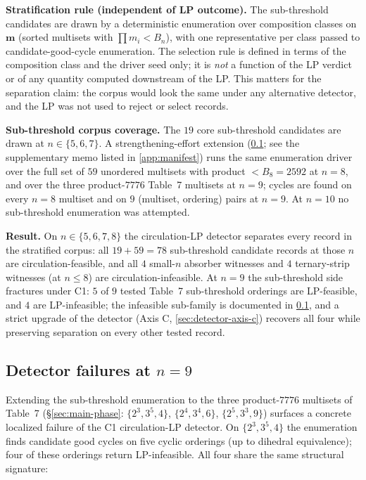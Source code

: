 \documentclass[11pt,a4paper]{article}
\theoremstyle{plain}
\theoremstyle{definition}
\newcommand{\Bn}{B_n}
\begin{document}
\textbf{Stratification rule (independent of LP outcome).} The
sub-threshold candidates are drawn by a deterministic enumeration
over composition classes on $\mathbf{m}$ (sorted multisets with
$\prod m_i < \Bn$), with one representative per class passed to
candidate-good-cycle enumeration.  The selection rule is defined in
terms of the composition class and the driver seed only; it is
\emph{not} a function of the LP verdict or of any quantity computed
downstream of the LP.  This matters for the separation claim: the
corpus would look the same under any alternative detector, and the
LP was not used to reject or select records.

\textbf{Sub-threshold corpus coverage.}  The $19$ core sub-threshold
candidates are drawn at $n \in \{5, 6, 7\}$.  A strengthening-effort
extension (\cref{sec:detector-n9-counterexamples}; see the
supplementary memo listed in \cref{app:manifest}) runs the same
enumeration driver over the full set of $59$ unordered multisets
with product $< B_8 = 2592$ at $n = 8$, and over the three
product-$7776$ Table~7 multisets at $n = 9$; cycles are found on
every $n = 8$ multiset and on $9$ (multiset, ordering) pairs at
$n = 9$.  At $n = 10$ no sub-threshold enumeration was attempted.

\textbf{Result.} On $n \in \{5, 6, 7, 8\}$ the circulation-LP
detector separates every record in the stratified corpus: all $19 +
59 = 78$ sub-threshold candidate records at those $n$ are
circulation-feasible, and all $4$ small-$n$ absorber witnesses and
$4$ ternary-strip witnesses (at $n \le 8$) are
circulation-infeasible.  At $n = 9$ the sub-threshold side fractures
under C1: $5$ of $9$ tested Table~7 sub-threshold orderings are
LP-feasible, and $4$ are LP-infeasible; the infeasible sub-family is
documented in \cref{sec:detector-n9-counterexamples}, and a strict
upgrade of the detector (Axis C, \cref{sec:detector-axis-c}) recovers
all four while preserving separation on every other tested record.

\subsection{Detector failures at $n = 9$}\label{sec:detector-n9-counterexamples}

Extending the sub-threshold enumeration to the three product-$7776$
multisets of Table~7 (\S\ref{sec:main-phase}: $\{2^3, 3^5, 4\}$,
$\{2^4, 3^4, 6\}$, $\{2^5, 3^3, 9\}$) surfaces a concrete localized
failure of the C1 circulation-LP detector.  On $\{2^3, 3^5, 4\}$
the enumeration finds candidate good cycles on five cyclic orderings
(up to dihedral equivalence); four of these orderings return
LP-infeasible.  All four share the same structural signature:
\end{document}
